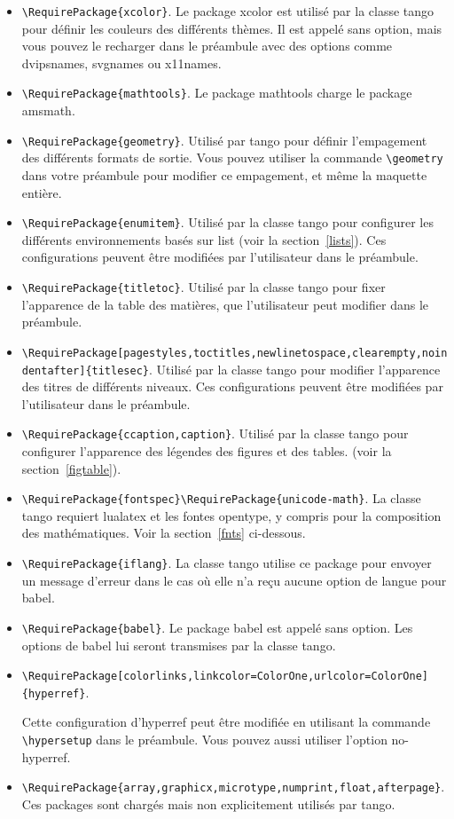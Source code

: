 \documentclass[french,ColorTheme=USAF,FontSize=10pt]{tango}
\newcommand\TO[1]{\textsf{#1}}
\begin{document}
\begin{itemize}
\item \verb=\RequirePackage{xcolor}=. Le package \TO{xcolor} est utilisé par la classe tango pour définir les couleurs des différents thèmes. Il est appelé sans option, mais vous pouvez le recharger dans le préambule avec des options comme \TO{dvipsnames}, \TO{svgnames} ou \TO{x11names}.
\item\verb=\RequirePackage{mathtools}=. Le package \TO{mathtools} charge le package \TO{amsmath}. 
\item\verb=\RequirePackage{geometry}=. Utilisé par tango pour définir l'empagement des différents formats de sortie. Vous pouvez utiliser la commande \verb=\geometry= dans votre préambule pour modifier ce empagement, et même la maquette entière.
\item\verb=\RequirePackage{enumitem}=. Utilisé par la classe tango pour configurer les différents environnements basés sur  \TO{list} (voir la section~\ref{lists}). Ces configurations peuvent être modifiées par l'utilisateur dans le préambule.
\item\verb=\RequirePackage{titletoc}=. Utilisé par la classe tango pour fixer l'apparence de la table des matières, que l'utilisateur peut modifier dans le préambule.
\item\verb=\RequirePackage[pagestyles,toctitles,newlinetospace,clearempty,noindentafter]{titlesec}=. Utilisé par la classe tango pour modifier l'apparence des titres de différents niveaux. Ces configurations peuvent être modifiées par l'utilisateur dans le préambule.
\item\verb=\RequirePackage{ccaption,caption}=. Utilisé par la classe tango pour configurer l'apparence des légendes des figures et des tables. (voir la section~\ref{figtable}).
\item\verb=\RequirePackage{fontspec}\RequirePackage{unicode-math}=. La classe tango requiert  \TO{lualatex} et les fontes opentype, y compris pour la composition des mathématiques. Voir la section~\ref{fnts} ci-dessous.
\item\verb=\RequirePackage{iflang}=. La classe tango utilise ce package pour envoyer un message d'erreur dans le cas où elle n'a reçu aucune option de langue pour \TO{babel}.
\item\verb=\RequirePackage{babel}=. Le package babel est appelé sans option. Les options de babel lui seront transmises par la classe tango. %
\item\verb+\RequirePackage[colorlinks,linkcolor=ColorOne,urlcolor=ColorOne]{hyperref}+.\par Cette configuration d'\TO{hyperref} peut être modifiée en utilisant la commande \verb=\hypersetup= dans le préambule. Vous pouvez aussi utiliser l'option  \TO{no-hyperref}.
\item\verb=\RequirePackage{array,graphicx,microtype,numprint,float,afterpage}=. Ces packages sont chargés mais non explicitement utilisés par tango.
\end{itemize}
\end{document}
